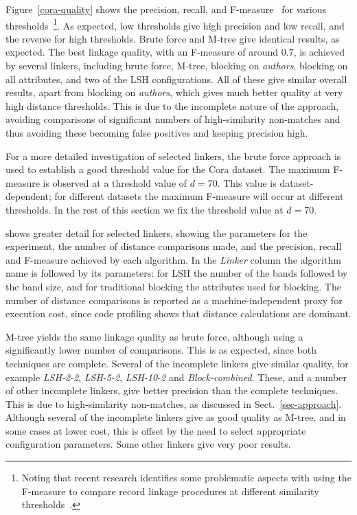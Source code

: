 \documentclass{llncs}
\begin{document}
Figure~\ref{cora-quality} shows the precision, recall, and
F-measure~\cite{Chr12} for various thresholds~\footnote{Noting that
recent research identifies some problematic aspects with using the
F-measure to compare record linkage procedures at different similarity
thresholds~\cite{Han18}.}. As expected, low thresholds give high
precision and low recall, and the reverse for high thresholds. Brute
force and M-tree give identical results, as expected. The best linkage
quality, with an F-measure of around 0.7, is achieved by several
linkers, including brute force, M-tree, blocking on \emph{authors},
blocking on all attributes, and two of the LSH configurations. All of
these give similar overall results, apart from blocking on
\emph{authors}, which gives much better quality at very high distance
thresholds. This is due to the incomplete nature of the approach,
avoiding comparisons of significant numbers of high-similarity
non-matches and thus avoiding these becoming false positives and keeping
precision high.

For a more detailed investigation of selected linkers, the brute force
approach is used to establish a good threshold value for the Cora
dataset. The maximum F-measure is observed at a threshold value of
$d=70$. This value is dataset-dependent; for different datasets the
maximum F-measure will occur at different thresholds. In the rest of
this section we fix the threshold value at $d=70$.

 shows greater detail for selected
linkers, showing the parameters for the experiment, the number of
distance comparisons made, and the precision, recall and F-measure
achieved by each algorithm. In the \emph{Linker} column the algorithm
name is followed by its parameters: for LSH the number of the bands
followed by the band size, and for traditional blocking the attributes
used for blocking. The number of distance comparisons is reported as a
machine-independent proxy for execution cost, since code profiling
shows that distance calculations are dominant.

M-tree yields the same linkage quality as brute force, although using a
significantly lower number of comparisons. This is as expected, since
both techniques are complete. Several of the incomplete linkers give
similar quality, for example \emph{LSH-2-2}, \emph{LSH-5-2},
\emph{LSH-10-2} and \emph{Block-combined}. These, and a number of other
incomplete linkers, give better precision than the complete techniques.
This is due to high-similarity non-matches, as discussed in
Sect.~\ref{sec-approach}. Although several of the incomplete linkers
give as good quality as M-tree, and in some cases at lower cost, this
is offset by the need to select appropriate configuration parameters.
Some other linkers give very poor results.
\end{document}
